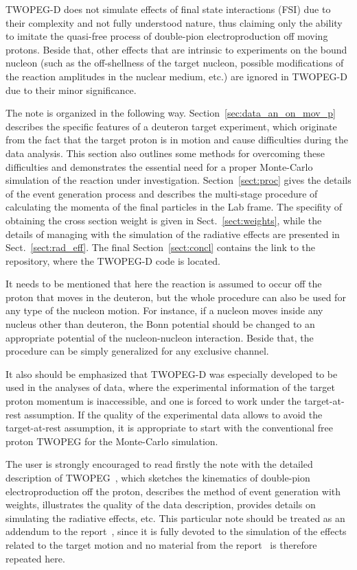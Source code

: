 TWOPEG-D does not simulate effects of final state interactions (FSI) due to their complexity and not fully understood nature, thus claiming only the ability to imitate the quasi-free process of double-pion electroproduction off moving protons. Beside that, other effects that are  intrinsic to experiments on the bound nucleon (such as the off-shellness of the target nucleon, possible modifications of the reaction amplitudes in the nuclear medium, etc.) are ignored in TWOPEG-D due to their minor significance.

The note is organized in the following way. Section~\ref{sec:data_an_on_mov_p} describes the specific features of a deuteron target experiment, which originate from the fact that the target proton is in motion and cause difficulties during the data analysis. This section also outlines some methods for overcoming these difficulties and demonstrates the essential need for a proper Monte-Carlo simulation of the reaction under investigation. Section~\ref{sect:proc} gives the details of the event generation process and describes the multi-stage procedure of calculating the momenta of the final particles in the Lab frame. The specifity of obtaining the cross section weight is given in Sect.~\ref{sect:weights}, while the details of managing with the simulation of the radiative effects are presented in Sect.~\ref{sect:rad_eff}. The final Section~\ref{sect:concl} contains the link to the repository, where the TWOPEG-D code is located.


It needs to be mentioned that here the reaction is assumed to occur off the proton that moves in the deuteron, but the whole procedure can also be used for any type of the nucleon motion. For instance, if a nucleon  moves inside any nucleus other than deuteron, the Bonn potential should be changed to an appropriate potential of the nucleon-nucleon interaction. Beside that, the procedure can be simply generalized for any exclusive channel.

It also should be emphasized that TWOPEG-D was especially developed to be used in the analyses of data, where the experimental information of the target proton momentum is inaccessible, and one is forced to work under the target-at-rest assumption. If the quality of the experimental data allows to avoid the target-at-rest assumption, it is appropriate to start with the conventional free proton TWOPEG for the Monte-Carlo simulation. 

The user is strongly encouraged to read firstly the note with the detailed description of TWOPEG~\cite{twopeg}, which sketches the kinematics of double-pion electroproduction off the proton, describes the method of event generation with weights, illustrates the quality of the data description, provides details on simulating the radiative effects, etc. This particular note should be treated as an addendum to the report~\cite{twopeg}, since it is fully devoted to the simulation of the effects related to the target motion and no material from the report~\cite{twopeg} is therefore repeated here.  








